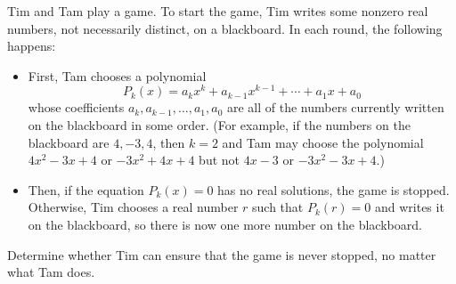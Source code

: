 Tim and Tam play a game. To start the game, Tim writes some nonzero real numbers, not necessarily distinct, on a blackboard. In each round, the following happens:
\begin{itemize}
\item First, Tam chooses a polynomial
\[
P_k(x)=a_kx^k+a_{k-1}x^{k-1}+\cdots+a_1x+a_0
\]
whose coefficients $a_k,a_{k-1},\ldots,a_1,a_0$ are all of the numbers currently written on the blackboard in some order. (For example, if the numbers on the blackboard are $4,-3,4$, then $k=2$ and Tam may choose the polynomial $4x^2-3x+4$ or $-3x^2+4x+4$ but not $4x-3$ or $-3x^2-3x+4$.)
\item Then, if the equation $P_k(x)=0$ has no real solutions, the game is stopped. Otherwise, Tim chooses a real number $r$ such that $P_k(r)=0$ and writes it on the blackboard, so there is now one more number on the blackboard.
\end{itemize}
Determine whether Tim can ensure that the game is never stopped, no matter what Tam does.
